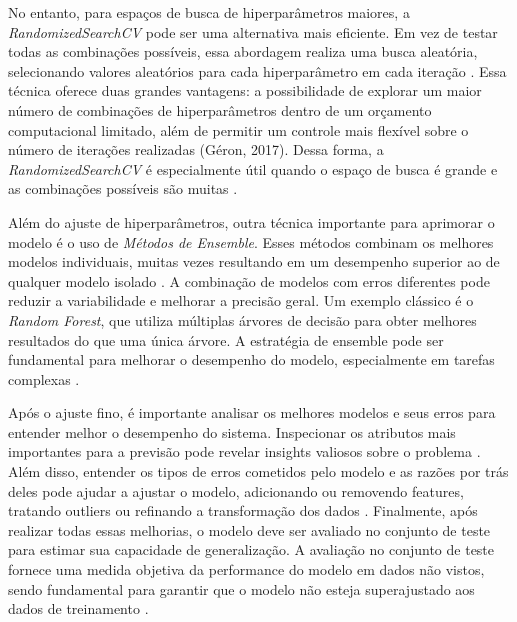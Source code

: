 No entanto, para espaços de busca de hiperparâmetros maiores, a \textit{RandomizedSearchCV} pode ser uma alternativa mais eficiente. Em vez de testar todas as combinações possíveis, essa abordagem realiza uma busca aleatória, selecionando valores aleatórios para cada hiperparâmetro em cada iteração \cite{geron2017}. Essa técnica oferece duas grandes vantagens: a possibilidade de explorar um maior número de combinações de hiperparâmetros dentro de um orçamento computacional limitado, além de permitir um controle mais flexível sobre o número de iterações realizadas (Géron, 2017). Dessa forma, a \textit{RandomizedSearchCV} é especialmente útil quando o espaço de busca é grande e as combinações possíveis são muitas \cite{geron2017}.

Além do ajuste de hiperparâmetros, outra técnica importante para aprimorar o modelo é o uso de \textit{Métodos de Ensemble}. Esses métodos combinam os melhores modelos individuais, muitas vezes resultando em um desempenho superior ao de qualquer modelo isolado \cite{geron2017}. A combinação de modelos com erros diferentes pode reduzir a variabilidade e melhorar a precisão geral. Um exemplo clássico é o \textit{Random Forest}, que utiliza múltiplas árvores de decisão para obter melhores resultados do que uma única árvore. A estratégia de ensemble pode ser fundamental para melhorar o desempenho do modelo, especialmente em tarefas complexas \cite{geron2017}.

Após o ajuste fino, é importante analisar os melhores modelos e seus erros para entender melhor o desempenho do sistema. Inspecionar os atributos mais importantes para a previsão pode revelar insights valiosos sobre o problema \cite{muller2017}. Além disso, entender os tipos de erros cometidos pelo modelo e as razões por trás deles pode ajudar a ajustar o modelo, adicionando ou removendo features, tratando outliers ou refinando a transformação dos dados \cite{muller2017}. Finalmente, após realizar todas essas melhorias, o modelo deve ser avaliado no conjunto de teste para estimar sua capacidade de generalização. A avaliação no conjunto de teste fornece uma medida objetiva da performance do modelo em dados não vistos, sendo fundamental para garantir que o modelo não esteja superajustado aos dados de treinamento \cite{muller2017}.


